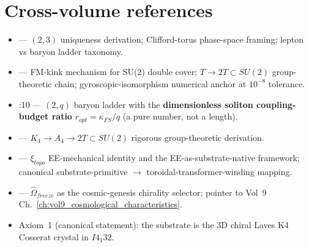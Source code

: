 \section{Cross-volume references}
\label{sec:vol9_topological_cross_refs}

\begin{itemize}
    \item {} --- $(2, 3)$ uniqueness derivation; Clifford-torus phase-space framing; lepton vs baryon ladder taxonomy.
    \item {} --- FM-kink mechanism for SU(2) double cover; $T \to 2T \subset SU(2)$ group-theoretic chain; gyroscopic-isomorphism numerical anchor at $10^{-8}$ tolerance.
    \item {}:10 --- $(2, q)$ baryon ladder with the \textbf{dimensionless soliton coupling-budget ratio} $r_{opt} = \kappa_{FS}/q$ (a pure number, not a length).
    \item {} --- $K_4 \to A_4 \to 2T \subset SU(2)$ rigorous group-theoretic derivation.
    \item {} --- $\xi_{topo}$ EE-mechanical identity and the EE-as-substrate-native framework; canonical substrate-primitive $\to$ toroidal-transformer-winding mapping.
    \item {} --- $\hat{\Omega}_{freeze}$ as the cosmic-genesis chirality selector; pointer to Vol~9 Ch.~\ref{ch:vol9_cosmological_characteristics}.
    \item Axiom~1 (canonical statement): the substrate is the 3D chiral Laves K4 Cosserat crystal in $I4_1 32$.
\end{itemize}
%
